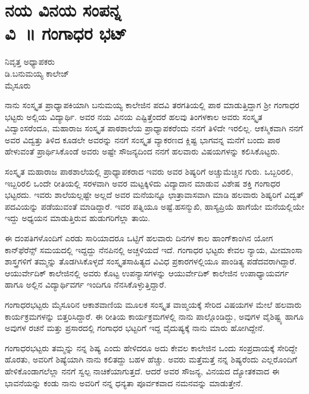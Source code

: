 {\fontsize{14}{16}\selectfont
\chapter[ನಯ ವಿನಯ ಸಂಪನ್ನ ವಿ~॥  ಗಂಗಾಧರ ಭಟ್]{ನಯ ವಿನಯ ಸಂಪನ್ನ \\ ವಿ~॥  ಗಂಗಾಧರ ಭಟ್}
\smallskip

\begin{center}
\smallskip

ನಿವೃತ್ತ ಅಧ್ಯಾಪಕರು\\
ಡಿ.ಬನುಮಯ್ಯ ಕಾಲೇಜ್\\
ಮೈಸೂರು
\addrule
\end{center}

ನಾನು ಸಂಸ್ಕೃತ ಪ್ರಾಧ್ಯಾಪಕಿಯಾಗಿ ಬನುಮಯ್ಯ ಕಾಲೇಜಿನ ಪದವಿ ತರಗತಿಯಲ್ಲಿ ಪಾಠ ಮಾಡುತ್ತಿದ್ದಾಗ ಶ್ರೀ ಗಂಗಾಧರ ಭಟ್ಟರು ಅಲ್ಲಿಯ ವಿದ್ಯಾರ್ಥಿ. ಅವರ ನಯ ವಿನಯ ಎಷ್ಟಿತ್ತೆಂದರೆ ಹಲವು ತಿಂಗಳಕಾಲ ಅವರು ಸಂಸ್ಕೃತ ವಿದ್ವಾಂಸರೆಂದೂ, ಮಹಾರಾಜ ಸಂಸ್ಕೃತ ಪಾಠಶಾಲೆಯ ಪ್ರಾಧ್ಯಾಪಕರೆಂದು ನನಗೆ ತಿಳಿದೇ ಇರಲಿಲ್ಲ. ಆಕಸ್ಮಿಕವಾಗಿ ನನಗೆ ಅವರ ವಿದ್ವತ್ತು ತಿಳಿದ ಕೂಡಲೇ ಅವರನ್ನು ನನಗೆ ಸಂಸ್ಕೃತ ವ್ಯಾಕರಣದ ಕ್ಲಿಷ್ಟ ಭಾಗವನ್ನ ಮನೆಗೆ ಬಂದು ಪಾಠ ಹೇಳುವಂತೆ ಪ್ರಾರ್ಥಿಸಿಕೊಂಡೆ ಅವರು ಅಷ್ಟೇ ಸೌಜನ್ಯದಿಂದ ನನಗೆ ಹಲವಾರು ವಿಷಯಗಳನ್ನು ಕಲಿಸಿಕೊಟ್ಟರು.

ಸಂಸ್ಕೃತ ಮಹಾರಾಜ ಪಾಠಶಾಲೆಯಲ್ಲಿ ಪ್ರಾಧ್ಯಾಪಕರಾದ ಇವರು ಅವರ \hbox{ಶಿಷ್ಯರಿಗೆ} ಅಚ್ಚುಮೆಚ್ಚಿನ ಗುರು. ಒಬ್ಬರಿರಲಿ, ಇಬ್ಬರಿರಲಿ ಒಂದೇ ರೀತಿಯಲ್ಲಿ ಸರಳವಾಗಿ ಅವರ ಮಟ್ಟಕ್ಕಿಳಿದು ವಿದ್ಯಾದಾನ ಮಾಡುವ ವಿಶೇಷ ಶಕ್ತಿ ಗಂಗಾಧರ ಭಟ್ಟರದು. ಇವರು ಶಾಲೆಯಲ್ಲಷ್ಟೇ ಅಲ್ಲದೆ ಅವರ ಮನೆಯನ್ನೂ ಛಾತ್ರಾವಾಸವಾಗಿ ಮಾಡಿ ಹಲವಾರು \hbox{ಶಿಷ್ಯರಿಗೆ} ವಿದ್ವತ್ ಪದವಿಯನ್ನು ಪಡೆಯುವಂತೆ ಮಾಡಿದ್ದಾರೆ. ಇವರ ಪತ್ನಿಯೂ ಅಷ್ಟೆ.\break ಹಸನ್ಮುಖಿ, ಹಾಸ್ಯಪ್ರಿಯೆ ಹಾಗೆಯೇ ಮನೆಯಲ್ಲಿಯೇ ಇದ್ದು ಅಧ್ಯಯನ ಮಾಡುತ್ತಿರುವ ಹುಡುಗರಿಗೆಲ್ಲಾ ತಾಯಿ.

ಈ ದಂಪತಿಗಳೊಂದಿಗೆ ಎರಡು ಸಾರಿಯಾದರೂ ಒಟ್ಟಿಗೆ ಹಲವಾರು ದಿನಗಳ ಕಾಲ ಹಾಂಗ್‍ಕಾಂಗಿನ ಯೋಗ ಕಾನ್‍ಫೆರೆನ್ಸ್ ಸಮಯದಲ್ಲಿ ಇದ್ದದ್ದು ನೆನಪಿನಲ್ಲಿ ಅಚ್ಚಳಿಯದೆ ಇದೆ. ಗಂಗಾಧರ ಭಟ್ಟರು ಕೇವಲ ನ್ಯಾಯ, ಮೀಮಾಂಸಾ ಶಾಸ್ತ್ರಗಳಿಗೆ ತಮ್ಮನ್ನು ತೊಡಗಿಸಿ\-ಕೊಳ್ಳದೆ ಸಂಸ್ಕೃತಸಾಹಿತ್ಯದ ವಿವಿಧ ಪ್ರಕಾರಗಳಲ್ಲಿಯೂ ಪಾಂಡಿತ್ಯ ಪಡೆದವರಾಗಿದ್ದಾರೆ. ಆಯುರ್ವೇದಿಕ್ ಕಾಲೇಜಿನಲ್ಲಿ ಅವರು ಕೊಟ್ಟ ಉಪನ್ಯಾಸಗಳನ್ನು ಆಯುರ್ವೇದಿಕ್ ಕಾಲೇಜಿನ ಉಪಾಧ್ಯಾಯವರ್ಗ ಹಾಗೂ ಅಲ್ಲಿನ ವಿದ್ಯಾರ್ಥಿವರ್ಗ ಇಂದಿಗೂ ನೆನಸಿಕೊಳ್ಳುತ್ತಿದ್ದಾರೆ.

ಗಂಗಾಧರಭಟ್ಟರು ಮೈಸೂರಿನ ಆಕಾಶವಾಣಿಯ ಮೂಲಕ ಸಂಸ್ಕೃತ ವಾಙ್ಮಯಕ್ಕೆ ಸೇರಿದ ವಿಷಯಗಳ ಮೇಲೆ ಹಲವಾರು ಕಾರ್ಯಕ್ರಮಗಳನ್ನು ಬಿತ್ತರಿಸಿದ್ದಾರೆ. ಈ ರೀತಿಯ ಕಾರ್ಯಕ್ರಮಗಳಲ್ಲಿ ನಾನು ಪಾಲ್ಗೊಂಡಿದ್ದು, ಅವುಗಳ ವೈಶಿಷ್ಟ್ಯ ಹಾಗೂ ಅವುಗಳ ರಚನೆ ಮತ್ತು ಪ್ರಸಾರದಲ್ಲಿ ಗಂಗಾಧರ ಭಟ್ಟರಿಗೆ ಇದ್ದ ವೈದುಷ್ಯಕ್ಕೆ ನಾನು ಮಾರು ಹೋಗಿದ್ದೇನೆ.

ಗಂಗಾಧರಭಟ್ಟರು ತಮ್ಮನ್ನು ನನ್ನ ಶಿಷ್ಯ ಎಂದು ಹೇಳಿದರೂ ಅದು ಕೇವಲ ಕಾಲೇಜಿನ ಒಂದು ಸಂಪ್ರದಾಯಕ್ಕೆ ಸೇರಿದ್ದೇ ಹೊರತು, ಅವರಿಗೆ ಶಿಷ್ಯೆಯಾಗಿ ನಾನು ಕಲಿತದ್ದು ಬಹಳ ಹೆಚ್ಚು. ಅವರು ಮತ್ತೆಮತ್ತೆ ನನ್ನ ಶಿಷ್ಯರೆಂದು ಎಲ್ಲರೊಂದಿಗೆ ಹೇಳಿಕೊಂಡಾಗಲೆಲ್ಲಾ ನನಗೆ ಸ್ವಲ್ಪ ನಾಚಿಕೆಯಾಗುತ್ತದೆ. ಆದರೆ ಅವರ ಸೌಜನ್ಯ, ವಿನಯದ ದ್ಯೋತಕವಾದ ಈ ಭಾವನೆಯನ್ನು ಕಂಡು ನಾನು ಅವರಿಗೆ ನನ್ನ ಧನ್ಯತಾ ಪೂರ್ವಕವಾದ ನಮನವನ್ನು ಮಾಡುತ್ತೇನೆ.

}
